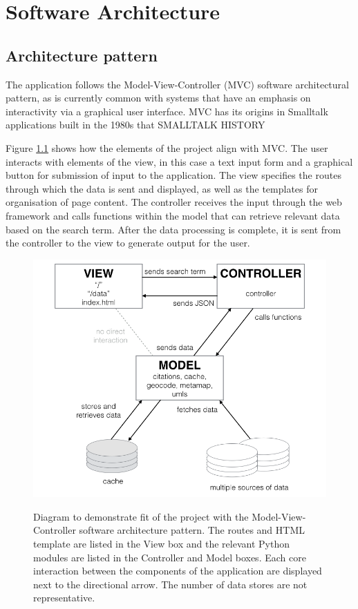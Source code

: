 \documentclass[Report.tex]{subfiles}
\begin{document}
\chapter{Software Architecture}
\section{Architecture pattern}
The application follows the Model-View-Controller (MVC) software architectural pattern, as is currently common with systems that have an emphasis on interactivity via a graphical user interface. MVC has its origins in Smalltalk applications built in the 1980s that SMALLTALK HISTORY

\noindent Figure \ref{fig:mvc} shows how the elements of the project align with MVC. The user interacts with elements of the view, in this case a text input form and a graphical button for submission of input to the application. The view specifies the routes through which the data is sent and displayed, as well as the templates for organisation of page content\cite{mozilla_mvc}. The controller receives the input through the web framework and calls functions within the model that can retrieve relevant data based on the search term.  After the data processing is complete, it is sent from the controller to the view to generate output for the user. \newline

\begin{figure}[h!]
	\includegraphics[width=\textwidth]{../lib/images/mvc.png}
	\label{fig:mvc}
	\caption{Diagram to demonstrate fit of the project with the Model-View-Controller software architecture pattern. The routes and HTML template are listed in the View box and the relevant Python modules are listed in the Controller and Model boxes. Each core interaction between the components of the application are displayed next to the directional arrow. The number of data stores are not representative.}
\end{figure}
\end{document}
